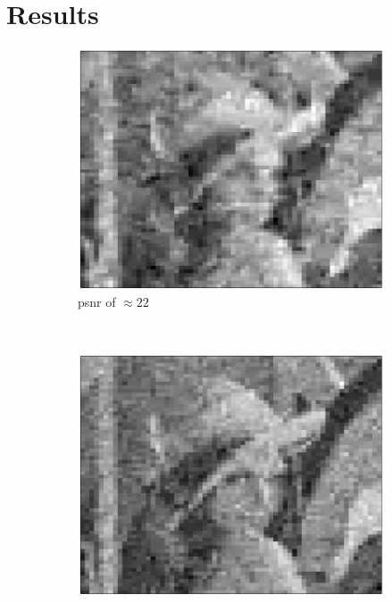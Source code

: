 \documentclass{article}
\begin{document}


\section{Results}

\begin{figure}[h]
		\begin{subfigure}[b]{0.19\textwidth}
                \centering
				\includegraphics[width=\textwidth]{img/img_22_psnr}
				\caption{psnr of $\approx 22$}
				\label{psnr_22}
		\end{subfigure}%
		~ %
		\begin{subfigure}[b]{0.19\textwidth}
                \centering
				\includegraphics[width=\textwidth]{img/img_24_psnr}

\end{subfigure}
\end{figure}
\end{document}

